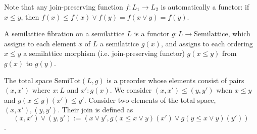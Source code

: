 \documentclass{article}
\begin{document}
      Note that any join-preserving function $f : L_1 \rightarrow L_2$ is automatically a functor: if $x \leq y$, then $f(x) \leq f(x) \vee f(y) = f(x \vee y) = f(y)$. 

      A semilattice fibration on a semilattice $L$ is a functor $g : L \rightarrow \mathrm{Semilattice}$, which assigns to each element $x$ of $L$ a semilattice $g(x)$, and assigns to each ordering $x \leq y$ a semilattice morphism (i.e. join-preserving functor) $g(x \leq y)$ from $g(x)$ to $g(y)$.

      The total space $\mathrm{SemiTot}(L, g)$ is a preorder whose elements consist of pairs $(x, x')$ where $x : L$ and $x' : g(x)$. We consider $(x, x') \leq (y, y')$ when $x \leq y$ and $g(x \leq y)(x') \leq y'$. Consider two elements of the total space, $(x, x'), (y, y')$. Their join is defined as $$(x, x') \vee (y, y') := (x \vee y', g(x \leq x \vee y)(x') \vee g(y \leq x \vee y)(y'))$$. 
\end{document}
